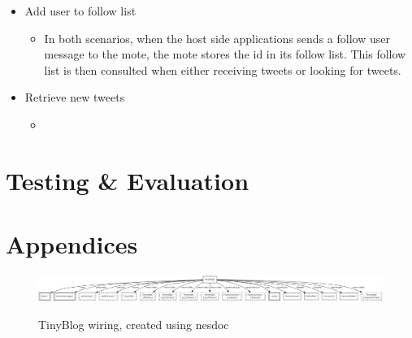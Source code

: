 \documentclass{article}
\begin{document}
\begin{itemize}
\begin{itemize}
\begin{itemize}
			\item Add user to follow list
			\begin{itemize}
			 	\item In both scenarios, when the host side applications sends a follow user message to the mote, the mote stores the id in its follow list. This follow list is then consulted when either receiving tweets or looking for tweets. 
			 \end{itemize} 
			 \item Retrieve new tweets
			 \begin{itemize}
			 	\item 
			 \end{itemize}
		\end{itemize}

	\end{itemize}
\end{itemize}

\section{Testing \& Evaluation}


\section{Appendices}
\begin{figure}[htb!]
\centering
\includegraphics[scale=.27,angle=90]{TinyBlogAppC.png}
\label{fig:fullWiring}
\caption{TinyBlog wiring, created using nesdoc}
\end{figure}
\end{document}
